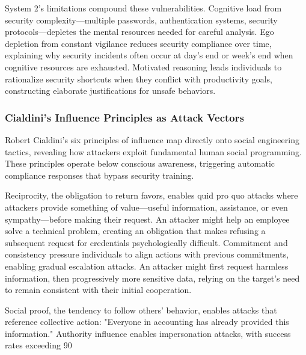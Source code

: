 \documentclass[manuscript,screen,review]{acmart}
\begin{document}
System 2's limitations compound these vulnerabilities. Cognitive load from security complexity—multiple passwords, authentication systems, security protocols—depletes the mental resources needed for careful analysis. Ego depletion from constant vigilance reduces security compliance over time, explaining why security incidents often occur at day's end or week's end when cognitive resources are exhausted. Motivated reasoning leads individuals to rationalize security shortcuts when they conflict with productivity goals, constructing elaborate justifications for unsafe behaviors.

\subsubsection{Cialdini's Influence Principles as Attack Vectors}

Robert Cialdini's six principles of influence\cite{cialdini2007} map directly onto social engineering tactics, revealing how attackers exploit fundamental human social programming. These principles operate below conscious awareness, triggering automatic compliance responses that bypass security training.

Reciprocity, the obligation to return favors, enables quid pro quo attacks where attackers provide something of value—useful information, assistance, or even sympathy—before making their request. An attacker might help an employee solve a technical problem, creating an obligation that makes refusing a subsequent request for credentials psychologically difficult. Commitment and consistency pressure individuals to align actions with previous commitments, enabling gradual escalation attacks. An attacker might first request harmless information, then progressively more sensitive data, relying on the target's need to remain consistent with their initial cooperation.

Social proof, the tendency to follow others' behavior, enables attacks that reference collective action: "Everyone in accounting has already provided this information." Authority influence enables impersonation attacks, with success rates exceeding 90%
\end{document}
